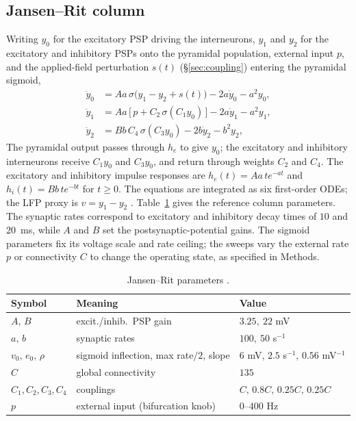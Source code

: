\documentclass[11pt,a4paper]{article}
\newcommand{\Sig}{\sigma}
\begin{document}
\subsection*{Jansen--Rit column}
Writing $y_0$ for the excitatory PSP driving the interneurons, $y_1$ and $y_2$ for the
excitatory and inhibitory PSPs onto the pyramidal population, external input $p$, and the
applied-field perturbation $s(t)$ (\S\ref{sec:coupling}) entering the pyramidal sigmoid,
\begin{align}
\ddot y_0 &= Aa\,\Sig\!\big(y_1-y_2+s(t)\big)-2a\dot y_0-a^2 y_0, \label{eq:jr0}\\
\ddot y_1 &= Aa\,\big[\,p+C_2\,\Sig(C_1 y_0)\,\big]-2a\dot y_1-a^2 y_1,\\
\ddot y_2 &= Bb\,C_4\,\Sig(C_3 y_0)-2b\dot y_2-b^2 y_2,
\end{align}
The pyramidal output passes through $h_e$ to give $y_0$; the excitatory
and inhibitory interneurons receive $C_1y_0$ and $C_3y_0$, and return through
weights $C_2$ and $C_4$. The excitatory and inhibitory impulse responses are
$h_e(t)=Aa\,t e^{-at}$ and $h_i(t)=Bb\,t e^{-bt}$ for $t\ge0$.
The equations are integrated as six first-order ODEs; the LFP proxy is $v=y_1-y_2$ \cite{jansen1995}.
Table~\ref{tab:params} gives the reference column parameters. The synaptic rates
correspond to excitatory and inhibitory decay times of $10$ and $20$~ms, while
$A$ and $B$ set the postsynaptic-potential gains. The sigmoid parameters fix its
voltage scale and rate ceiling; the sweeps vary the external rate $p$ or connectivity
$C$ to change the operating state, as specified in Methods.

\begin{table}[h]\centering\small
\caption{Jansen--Rit parameters \cite{jansen1995}.}
\label{tab:params}
\begin{tabular}{@{}lll@{}}
\toprule
Symbol & Meaning & Value\\
\midrule
$A,\,B$ & excit./inhib.\ PSP gain & $3.25,\ 22$ mV\\
$a,\,b$ & synaptic rates & $100,\ 50$ s$^{-1}$\\
$v_0,\,e_0,\,\rho$ & sigmoid inflection, max rate$/2$, slope & $6$ mV, $2.5$ s$^{-1}$, $0.56$ mV$^{-1}$\\
$C$ & global connectivity & $135$\\
$C_1,C_2,C_3,C_4$ & couplings & $C,\,0.8C,\,0.25C,\,0.25C$\\
$p$ & external input (bifurcation knob) & $0$--$400$ Hz\\
\bottomrule
\end{tabular}
\end{table}
\end{document}
